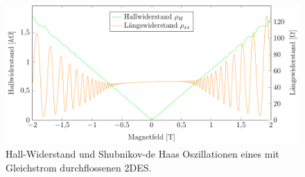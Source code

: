\begin{figure}[h]
	\centering
	\includegraphics{graphs/ac/pm2T_range.pdf}
	\caption[Höher aufgelöste Gleichstrommessung in Magnetfeldteilbereich]{
		Hall-Widerstand und Shubnikov-de Haas Oszillationen eines mit Gleichstrom durchflossenen 2DES.
	}
	\label{fig:2T_range_ac}
\end{figure}



